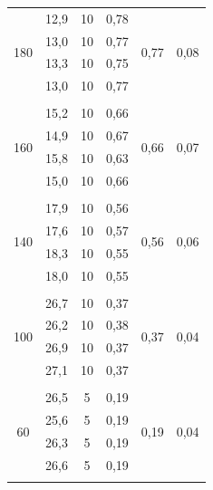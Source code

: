 \documentclass[a4paper, 12pt]{article}%
\begin{document}
\begin{enumerate}
\begin{longtable} {|c|c|c|c|c|c|}
		\multirow{4}{*}{180}& 12,9 & 10 & 0,78 &  \multirow{4}{*}{0,77}    & \multirow{4}{*}{0,08}\\ \cline{2-4}
		& 13,0 & 10 &    0,77         &               &\\ \cline{2-4}
		& 13,3 & 10 &     0,75         &              & \\ \cline{2-4}
		& 13,0 & 10 &    0,77           &             &\\ \hline
		&&&&&\\ \hline
		
		\multirow{4}{*}{160}& 15,2 & 10 & 0,66 &  \multirow{4}{*}{0,66}    & \multirow{4}{*}{0,07}\\ \cline{2-4}
		& 14,9 & 10 &    0,67         &               &\\ \cline{2-4}
		& 15,8 & 10 &     0,63         &              & \\ \cline{2-4}
		& 15,0 & 10 &    0,66           &             &\\ \hline
		&&&&&\\ \hline
		
		\multirow{4}{*}{140}& 17,9 & 10 & 0,56 &  \multirow{4}{*}{0,56}    & \multirow{4}{*}{0,06}\\ \cline{2-4}
		& 17,6 & 10 &    0,57         &               &\\ \cline{2-4}
		& 18,3 & 10 &     0,55         &              & \\ \cline{2-4}
		& 18,0 & 10 &    0,55           &             &\\ \hline
		&&&&&\\ \hline
		
		\multirow{4}{*}{100}& 26,7 & 10 & 0,37 &  \multirow{4}{*}{0,37}    & \multirow{4}{*}{0,04}\\ \cline{2-4}
		& 26,2 & 10 &    0,38         &               &\\ \cline{2-4}
		& 26,9 & 10 &     0,37         &              & \\ \cline{2-4}
		& 27,1 & 10 &    0,37           &             &\\ \hline
		&&&&&\\ \hline
		
		\multirow{4}{*}{60}& 26,5 & 5 & 0,19 &  \multirow{4}{*}{0,19}    & \multirow{4}{*}{0,04}\\ \cline{2-4}
		& 25,6 & 5 &    0,19         &               &\\ \cline{2-4}
		& 26,3 & 5 &     0,19         &              & \\ \cline{2-4}
		& 26,6 & 5 &    0,19           &             &\\ \hline
		&&&&&\\ \hline
		

\end{longtable}
\end{enumerate}
\end{document}
